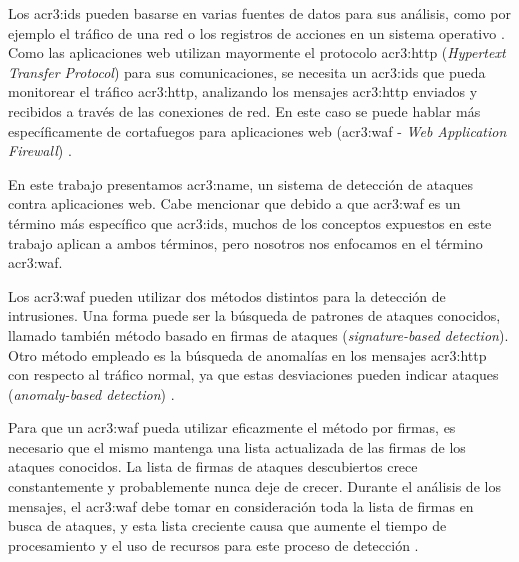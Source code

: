 Los \gls{acr3:ids} pueden basarse en varias fuentes de datos para sus
análisis, como por ejemplo el tráfico de una red o los registros de
acciones en un sistema operativo
\citep{torranoGimenez2015study}. %
Como las aplicaciones web utilizan mayormente el protocolo \gls{acr3:http}
(\textit{Hypertext Transfer Protocol}) \citep{fielding1999http} para sus
comunicaciones, se necesita un \gls{acr3:ids} que pueda monitorear el
tráfico \gls{acr3:http}, analizando los mensajes \gls{acr3:http} enviados
y recibidos a través de las conexiones de red.
En este caso se puede hablar más específicamente de cortafuegos para
aplicaciones web (\gls{acr3:waf} - \textit{Web Application Firewall})
\citep{torranoGimenez2015study}. %

En este trabajo presentamos \gls{acr3:name}, un sistema de detección de
ataques contra aplicaciones web.
Cabe mencionar que debido a que \gls{acr3:waf} es un término más específico
que \gls{acr3:ids}, muchos de los conceptos expuestos en este trabajo
aplican a ambos términos, pero nosotros nos enfocamos en el término
\gls{acr3:waf}.
\bigskip

Los \gls{acr3:waf} pueden utilizar dos métodos distintos para la detección
de intrusiones. Una forma puede ser la búsqueda de patrones de ataques
conocidos, llamado también método basado en firmas de ataques
(\textit{signature-based detection}). Otro método empleado es la búsqueda
de anomalías en los mensajes \gls{acr3:http} con respecto al tráfico
normal, ya que estas desviaciones pueden indicar ataques
(\textit{anomaly-based detection})
\citep{torranoGimenez2015study}. %

Para que un \gls{acr3:waf} pueda utilizar eficazmente el método por
firmas, es necesario que el mismo mantenga una lista actualizada de
las firmas de los ataques conocidos. La lista de firmas de ataques
descubiertos crece constantemente y probablemente nunca deje de crecer.
Durante el análisis de los mensajes, el \gls{acr3:waf} debe tomar en
consideración toda la lista de firmas en busca de ataques, y esta lista
creciente causa que aumente el tiempo de procesamiento y el uso de
recursos para este proceso de detección
\citep{kruegel2003anomaly}. %

